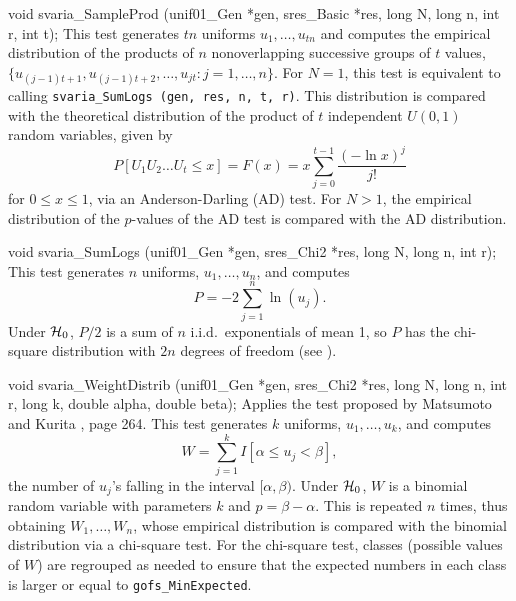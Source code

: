 void svaria_SampleProd (unif01_Gen *gen, sres_Basic *res,
                        long N, long n, int r, int t);
\endcode
 \tab
  This test generates $t n$ uniforms $u_1,\dots,u_{tn}$ and
  computes
  the empirical distribution of the products of $n$ nonoverlapping
  successive groups of $t$ values, $\{u_{(j-1)t + 1},  u_{(j-1)t + 2},
  \ldots, u_{jt}: j=1,\dots,n\}$.
  For $N=1$, this test is equivalent to calling
   {\tt svaria\_SumLogs (gen, res, n, t, r)}.
  This distribution is compared with the theoretical distribution of
  the product of $t$  independent $U(0,1)$ random variables, given by
  $$
  P[U_1U_2\ldots U_t \le x] = F(x) = x \sum_{j=0}^{t-1} \frac {(-\ln x)^j} {j!}
  $$
  for $0\le x\le 1$, via an Anderson-Darling (AD) test.
  For $N > 1$, the empirical distribution of the $p$-values of the
  AD test is compared with the AD distribution.
 \endtab
\code


void svaria_SumLogs (unif01_Gen *gen, sres_Chi2 *res,
                     long N, long n, int r);
\endcode
 \tab
  This test generates $n$ uniforms, $u_1,\dots,u_n$, and computes
   $$
    P = - 2 \sum_{j=1}^n \ln (u_j).
   $$
  Under $\mathcal{H}_0$, $P/2$ is a sum of $n$ i.i.d.\ exponentials of mean 1,
  so $P$ has the chi-square distribution with $2n$ degrees of freedom
  (see \cite{tSTE86a}).
 \endtab
\code


void svaria_WeightDistrib (unif01_Gen *gen, sres_Chi2 *res, long N, long n,
                           int r, long k, double alpha, double beta);
\endcode
 \tab
  Applies the test proposed by Matsumoto and Kurita \cite{rMAT94a}, page 264.
  This test
  generates $k$ uniforms, $u_1,\dots,u_k$, and computes
    $$ W = \sum_{j=1}^k I[\alpha\le u_j < \beta],$$
   the number of $u_j$'s falling in the interval $[\alpha,\beta)$.
   Under $\mathcal{H}_0$, $W$ is a binomial random variable  with parameters $k$ and
   $p = \beta-\alpha$.
   This is repeated $n$ times, thus obtaining $W_1,\dots,W_n$,
   whose empirical distribution is compared with the binomial
   distribution via a chi-square test.
   For the chi-square test, classes (possible values of $W$) are
   regrouped as needed to ensure that the expected numbers in each
   class is larger or equal to {\tt gofs\_MinExpected}.
 \endtab
\code



